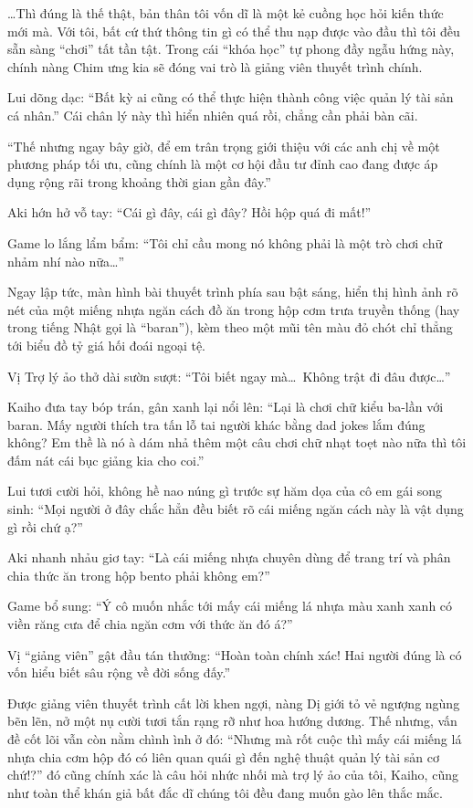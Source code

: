 \documentclass[../main.tex]{subfiles}
\begin{document}
\dots Thì đúng là thế thật, bản thân tôi vốn dĩ là một kẻ cuồng học hỏi kiến thức mới mà. Với tôi, bất cứ thứ thông tin gì có thể thu nạp được vào đầu thì tôi đều sẵn sàng ``chơi'' tất tần tật. Trong cái ``khóa học'' tự phong đầy ngẫu hứng này, chính nàng Chim ưng kia sẽ đóng vai trò là giảng viên thuyết trình chính.

Lui dõng dạc: ``Bất kỳ ai cũng có thể thực hiện thành công việc quản lý tài sản cá nhân.'' Cái chân lý này thì hiển nhiên quá rồi, chẳng cần phải bàn cãi.

``Thế nhưng ngay bây giờ, để em trân trọng giới thiệu với các anh chị về một phương pháp tối ưu, cũng chính là một cơ hội đầu tư đỉnh cao đang được áp dụng rộng rãi trong khoảng thời gian gần đây.''

Aki hớn hở vỗ tay: ``Cái gì đây, cái gì đây? Hồi hộp quá đi mất!''

Game lo lắng lẩm bẩm: ``Tôi chỉ cầu mong nó không phải là một trò chơi chữ nhảm nhí nào nữa\dots''

Ngay lập tức, màn hình bài thuyết trình phía sau bật sáng, hiển thị hình ảnh rõ nét của một miếng nhựa ngăn cách đồ ăn trong hộp cơm trưa truyền thống (hay trong tiếng Nhật gọi là ``baran''), kèm theo một mũi tên màu đỏ chót chỉ thẳng tới biểu đồ tỷ giá hối đoái ngoại tệ.


Vị Trợ lý ảo thở dài sườn sượt: ``Tôi biết ngay mà\dots\ Không trật đi đâu được\dots''

Kaiho đưa tay bóp trán, gân xanh lại nổi lên: ``Lại là chơi chữ kiểu ba-lần với baran. Mấy người thích tra tấn lỗ tai người khác bằng dad jokes lắm đúng không? Em thề là nó à dám nhả thêm một câu chơi chữ nhạt toẹt nào nữa thì tôi đấm nát cái bục giảng kia cho coi.''

Lui tươi cười hỏi, không hề nao núng gì trước sự hăm dọa của cô em gái song sinh: ``Mọi người ở đây chắc hẳn đều biết rõ cái miếng ngăn cách này là vật dụng gì rồi chứ ạ?''

Aki nhanh nhảu giơ tay: ``Là cái miếng nhựa chuyên dùng để trang trí và phân chia thức ăn trong hộp bento phải không em?''

Game bổ sung: ``Ý cô muốn nhắc tới mấy cái miếng lá nhựa màu xanh xanh có viền răng cưa để chia ngăn cơm với thức ăn đó á?''

Vị ``giảng viên'' gật đầu tán thưởng: ``Hoàn toàn chính xác! Hai người đúng là có vốn hiểu biết sâu rộng về đời sống đấy.''

Được giảng viên thuyết trình cất lời khen ngợi, nàng Dị giới tỏ vẻ ngượng ngùng bẽn lẽn, nở một nụ cười tươi tắn rạng rỡ như hoa hướng dương. Thế nhưng, vấn đề cốt lõi vẫn còn nằm chình ình ở đó: ``Nhưng mà rốt cuộc thì mấy cái miếng lá nhựa chia cơm hộp đó có liên quan quái gì đến nghệ thuật quản lý tài sản cơ chứ!?'' đó cũng chính xác là câu hỏi nhức nhối mà trợ lý ảo của tôi, Kaiho, cũng như toàn thể khán giả bất đắc dĩ chúng tôi đều đang muốn gào lên thắc mắc.
\end{document}
